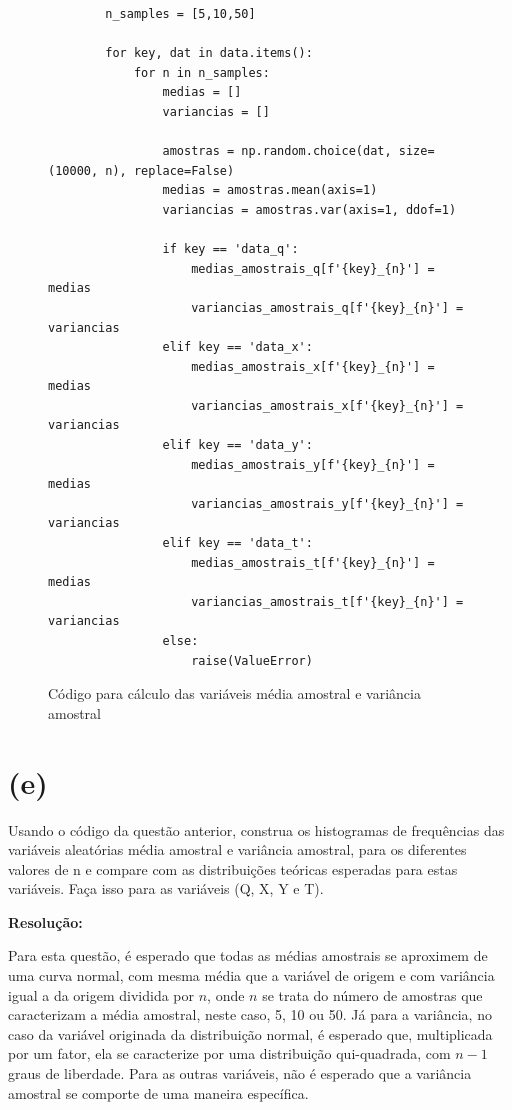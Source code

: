 \documentclass[]{abntex2}
\begin{document}
\begin{figure}[H]
    \centering
    \begin{minipage}{\textwidth}
    \begin{lstlisting}
        n_samples = [5,10,50]
        
        for key, dat in data.items():
            for n in n_samples:
                medias = []
                variancias = []
        
                amostras = np.random.choice(dat, size=(10000, n), replace=False)
                medias = amostras.mean(axis=1)
                variancias = amostras.var(axis=1, ddof=1)
        
                if key == 'data_q':
                    medias_amostrais_q[f'{key}_{n}'] = medias
                    variancias_amostrais_q[f'{key}_{n}'] = variancias
                elif key == 'data_x':
                    medias_amostrais_x[f'{key}_{n}'] = medias
                    variancias_amostrais_x[f'{key}_{n}'] = variancias
                elif key == 'data_y':
                    medias_amostrais_y[f'{key}_{n}'] = medias
                    variancias_amostrais_y[f'{key}_{n}'] = variancias
                elif key == 'data_t':
                    medias_amostrais_t[f'{key}_{n}'] = medias
                    variancias_amostrais_t[f'{key}_{n}'] = variancias
                else:
                    raise(ValueError)
    \end{lstlisting}   
    \end{minipage} 
    \caption{Código para cálculo das variáveis média amostral e variância amostral}
    \label{fig:cod}
\end{figure}


\section*{\textbf{(e)}}

\noindent Usando o código da questão anterior, construa os histogramas de frequências das
variáveis aleatórias média amostral e variância amostral, para os diferentes valores de n e compare com as distribuições teóricas esperadas para estas variáveis.
Faça isso para as variáveis (Q, X, Y e T).

\textbf{Resolução:}

Para esta questão, é esperado que todas as médias amostrais se aproximem de uma curva normal, com mesma média que a variável de origem e com variância igual a da origem dividida por $n$, onde $n$ se trata do número de amostras que caracterizam a média amostral, neste caso, 5, 10 ou 50. Já para a variância, no caso da variável originada da distribuição normal, é esperado que, multiplicada por um fator, ela se caracterize por uma distribuição qui-quadrada, com $n - 1$ graus de liberdade. Para as outras variáveis, não é esperado que a variância amostral se comporte de uma maneira específica.
\end{document}
